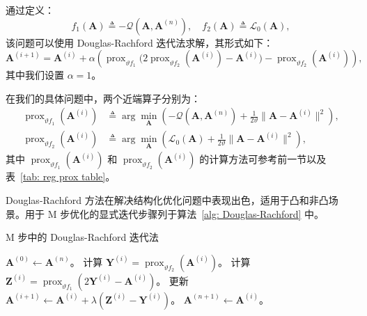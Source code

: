 通过定义：
\begin{equation}
    f_1(\mathbf{A}) \triangleq -\mathcal{Q}(\mathbf{A}, \mathbf{A}^{(n)}), \quad f_2(\mathbf{A}) \triangleq \mathcal{L}_0(\mathbf{A}),
\end{equation}
该问题可以使用 Douglas-Rachford 迭代法求解，其形式如下：
\begin{equation}
    \mathbf{A}^{(i+1)} = \mathbf{A}^{(i)} + \alpha \left( \operatorname{prox}_{\vartheta f_1} \big(2 \operatorname{prox}_{\vartheta f_2}(\mathbf{A}^{(i)}) - \mathbf{A}^{(i)} \big) - \operatorname{prox}_{\vartheta f_2}(\mathbf{A}^{(i)}) \right),
\end{equation}
其中我们设置 \(\alpha = 1\)。

在我们的具体问题中，两个近端算子分别为：
\begin{align}
    \operatorname{prox}_{\vartheta f_1}(\mathbf{A}^{(i)}) &\triangleq \arg\min_{\mathbf{A}} \left( -\mathcal{Q}(\mathbf{A}, \mathbf{A}^{(n)}) + \frac{1}{2\vartheta} \| \mathbf{A} - \mathbf{A}^{(i)} \|^2 \right), \\
    \operatorname{prox}_{\vartheta f_2}(\mathbf{A}^{(i)}) &\triangleq \arg\min_{\mathbf{A}} \left( \mathcal{L}_0(\mathbf{A}) + \frac{1}{2\vartheta} \| \mathbf{A} - \mathbf{A}^{(i)} \|^2 \right),
\end{align}
其中 \(\operatorname{prox}_{\vartheta f_1}(\mathbf{A}^{(i)})\) 和 \(\operatorname{prox}_{\vartheta f_2}(\mathbf{A}^{(i)})\) 的计算方法可参考前一节以及表~\ref{tab: reg prox table}。

Douglas-Rachford 方法在解决结构化优化问题中表现出色，适用于凸和非凸场景。用于 M 步优化的显式迭代步骤列于算法~\ref{alg: Douglas-Rachford} 中。

\begin{algorithm}[tb]
    \caption{M 步中的 Douglas-Rachford 迭代法}
    \label{alg: Douglas-Rachford}
    \begin{algorithmic}[1]
        \STATE \(\mathbf{A}^{(0)} \gets \mathbf{A}^{(n)}\)。
            \STATE 计算 \(\mathbf{Y}^{(i)} = \operatorname{prox}_{\vartheta f_2}(\mathbf{A}^{(i)})\)。
            \STATE 计算 \(\mathbf{Z}^{(i)} = \operatorname{prox}_{\vartheta f_1}(2\mathbf{Y}^{(i)} - \mathbf{A}^{(i)})\)。
            \STATE 更新 \(\mathbf{A}^{(i+1)} \gets \mathbf{A}^{(i)} + \lambda (\mathbf{Z}^{(i)} - \mathbf{Y}^{(i)})\)。 
        \ENDFOR
        \STATE \(\mathbf{A}^{(n+1)} \gets \mathbf{A}^{(i)}\)。
    \end{algorithmic}
\end{algorithm}

